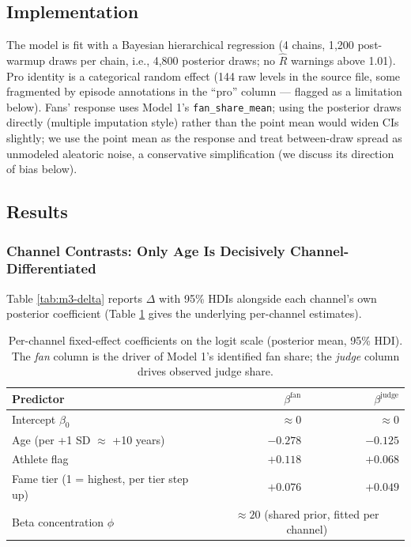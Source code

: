 \documentclass{article}
\begin{document}
\subsection{Implementation}

The model is fit with a Bayesian hierarchical regression (4 chains, 1{,}200 post-warmup draws per chain, i.e., 4{,}800 posterior draws; no $\hat R$ warnings above 1.01). Pro identity is a categorical random effect (144 raw levels in the source file, some fragmented by episode annotations in the ``pro'' column --- flagged as a limitation below). Fans' response uses Model 1's \texttt{fan\_share\_mean}; using the posterior draws directly (multiple imputation style) rather than the point mean would widen CIs slightly; we use the point mean as the response and treat between-draw spread as unmodeled aleatoric noise, a conservative simplification (we discuss its direction of bias below).

\subsection{Results}

\subsubsection{Channel Contrasts: Only Age Is Decisively Channel-Differentiated}

Table \ref{tab:m3-delta} reports $\Delta$ with 95\% HDIs alongside each channel's own posterior coefficient (Table \ref{tab:m3-coeffs} gives the underlying per-channel estimates).

\begin{table}[H]
\centering
\caption{Per-channel fixed-effect coefficients on the logit scale (posterior mean, 95\% HDI). The \emph{fan} column is the driver of Model 1's identified fan share; the \emph{judge} column drives observed judge share.}
\label{tab:m3-coeffs}
\begin{tabular}{lrr}
\toprule
Predictor & $\beta^{\text{fan}}$ & $\beta^{\text{judge}}$ \\
\midrule
Intercept $\beta_0$ & $\approx 0$ & $\approx 0$ \\
Age (per +1 SD $\approx$ +10 years) & $-0.278$ & $-0.125$ \\
Athlete flag & $+0.118$ & $+0.068$ \\
Fame tier (1 = highest, per tier step up) & $+0.076$ & $+0.049$ \\
Beta concentration $\phi$ & \multicolumn{2}{c}{$\approx 20$ (shared prior, fitted per channel)} \\
\bottomrule
\end{tabular}
\end{table}
\end{document}
